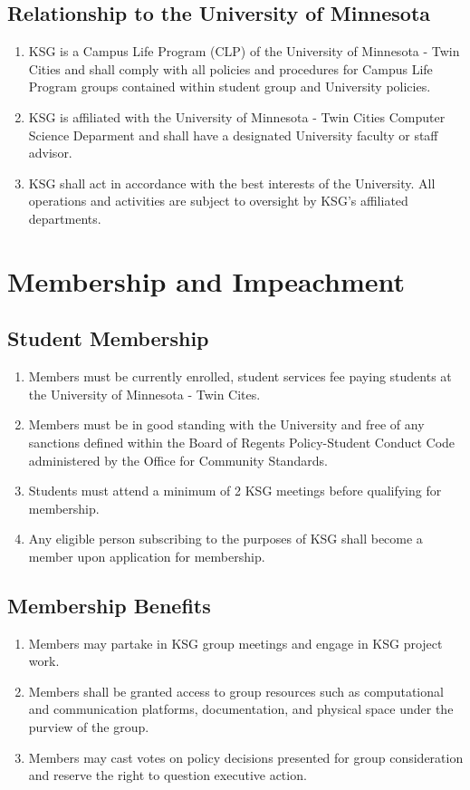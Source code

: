 \documentclass[12pt,executivepaper]{article}
\begin{document}
\subsection{Relationship to the University of Minnesota}
\begin{enumerate}
    \item KSG is a Campus Life Program (CLP) of the University of Minnesota -
          Twin Cities and shall comply with all policies and procedures for
          Campus Life Program groups contained within student group and
          University policies.
    \item KSG is affiliated with the University of Minnesota - Twin Cities
          Computer Science Deparment and shall have a designated University
          faculty or staff advisor.
    \item KSG shall act in accordance with the best interests of the
          University. All operations and activities are subject to oversight
          by KSG's affiliated departments.
\end{enumerate}

\section{Membership and Impeachment}

\subsection{Student Membership}
\begin{enumerate}
    \item Members must be currently enrolled, student services fee paying students at the
          University of Minnesota - Twin Cites.
    \item Members must be in good standing with the University and free of any sanctions defined
          within the Board of Regents Policy-Student Conduct Code administered by the Office
          for Community Standards.
    \item Students must attend a minimum of 2 KSG meetings before qualifying for
          membership.
    \item Any eligible person subscribing to the purposes of KSG shall become a
          member upon application for membership.
\end{enumerate}

\subsection{Membership Benefits}
\begin{enumerate}
    \item Members may partake in KSG group meetings and engage in KSG project work.
    \item Members shall be granted access to group resources such as computational
          and communication platforms, documentation, and physical space under the
          purview of the group.
    \item Members may cast votes on policy decisions presented for group consideration
          and reserve the right to question executive action.
\end{enumerate}
\end{document}
